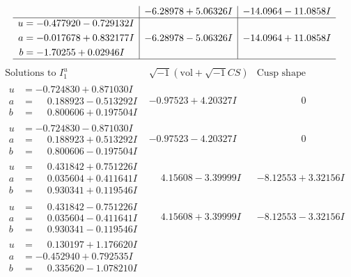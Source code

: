 \documentclass[1p]{elsarticle_modified}
\theoremstyle{definition}
\newcommand{\I}{\sqrt{-1}}
\begin{document}
$$\begin{array}{c|c|c}
 & -6.28978 + 5.06326 I & -14.0964 - 11.0858 I \\ \hline\begin{aligned}
u &= -0.477920 - 0.729132 I \\
a &= -0.017678 + 0.832177 I \\
b &= -1.70255 + 0.02946 I\end{aligned}
 & -6.28978 - 5.06326 I & -14.0964 + 11.0858 I\\
 \hline 
 \end{array}$$\newpage$$\begin{array}{c|c|c}  
\text{Solutions to }I^u_{1}& \I (\text{vol} + \sqrt{-1}CS) & \text{Cusp shape}\\
 \hline 
\begin{aligned}
u &= -0.724830 + 0.871030 I \\
a &= \phantom{-}0.188923 - 0.513292 I \\
b &= \phantom{-}0.800606 + 0.197504 I\end{aligned}
 & -0.97523 + 4.20327 I & \phantom{-0.000000 } 0 \\ \hline\begin{aligned}
u &= -0.724830 - 0.871030 I \\
a &= \phantom{-}0.188923 + 0.513292 I \\
b &= \phantom{-}0.800606 - 0.197504 I\end{aligned}
 & -0.97523 - 4.20327 I & \phantom{-0.000000 } 0 \\ \hline\begin{aligned}
u &= \phantom{-}0.431842 + 0.751226 I \\
a &= \phantom{-}0.035604 + 0.411641 I \\
b &= \phantom{-}0.930341 + 0.119546 I\end{aligned}
 & \phantom{-}4.15608 - 3.39999 I & -8.12553 + 3.32156 I \\ \hline\begin{aligned}
u &= \phantom{-}0.431842 - 0.751226 I \\
a &= \phantom{-}0.035604 - 0.411641 I \\
b &= \phantom{-}0.930341 - 0.119546 I\end{aligned}
 & \phantom{-}4.15608 + 3.39999 I & -8.12553 - 3.32156 I \\ \hline\begin{aligned}
u &= \phantom{-}0.130197 + 1.176620 I \\
a &= -0.452940 + 0.792535 I \\
b &= \phantom{-}0.335620 - 1.078210 I\end{aligned}

\end{array}$$
\end{document}
